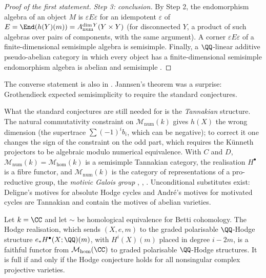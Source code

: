 \begin{proof}[Proof of the first statement]
\emph{Step 3: conclusion.} By Step 2, the endomorphism algebra of an object $M$ is $\varepsilon E\varepsilon$ for an idempotent $\varepsilon$ of $E = \End(h(Y)(m)) = A^{\dim Y}_{\mathrm{num}}(Y \times Y)$ (for disconnected $Y$,
a product of such algebras over pairs of components, with the same argument). A corner $\varepsilon E\varepsilon$ of a finite-dimensional semisimple algebra is semisimple. Finally, a $\QQ$-linear additive pseudo-abelian
category in which every object has a finite-dimensional semisimple endomorphism algebra is abelian and semisimple \cite{jannsen-1992}.
\end{proof}

The converse statement is also in \cite{jannsen-1992}. Jannsen's theorem was a surprise: Grothendieck expected semisimplicity to require the standard conjectures.

\begin{remark}\label{absolute-hodge:remark-tannakian}
What the standard conjectures are still needed for is the \emph{Tannakian} structure. The natural commutativity constraint on $\mathcal{M}_{\mathrm{num}}(k)$ gives $h(X)$ the wrong dimension (the
supertrace $\sum(-1)^ib_i$, which can be negative); to correct it one changes the sign of the constraint on the odd part, which requires the K\"unneth projectors to be algebraic modulo numerical
equivalence. With $C$ and $D$, $\mathcal{M}_{\mathrm{num}}(k) = \mathcal{M}_{\mathrm{hom}}(k)$ is a semisimple Tannakian category, the realisation $H^\bullet$ is a fibre functor, and $\mathcal{M}_{\mathrm{num}}(k)$ is the category of
representations of a pro-reductive group, the \emph{motivic Galois group} \cite{jannsen-1992}, \cite{andre-motifs}, \cite{deligne-milne}. Unconditional substitutes exist: Deligne's motives for absolute Hodge
cycles \cite{deligne-milne} and Andr\'e's motives for motivated cycles \cite{andre-1996-motifs} are Tannakian and contain the motives of abelian varieties.
\end{remark}

\begin{proposition}\label{absolute-hodge:proposition-motivic-hodge}
Let $k = \CC$ and let $\sim$ be homological equivalence for Betti cohomology. The Hodge realisation, which sends $(X, e, m)$ to the graded polarisable $\QQ$-Hodge structure $e_*H^\bullet(X; \QQ)(m)$, with
$H^i(X)(m)$ placed in degree $i - 2m$, is a faithful functor from $\mathcal{M}_{\mathrm{hom}}(\CC)$ to graded polarisable $\QQ$-Hodge structures. It is full if and only if the Hodge conjecture holds for all
nonsingular complex projective varieties.
\end{proposition}

